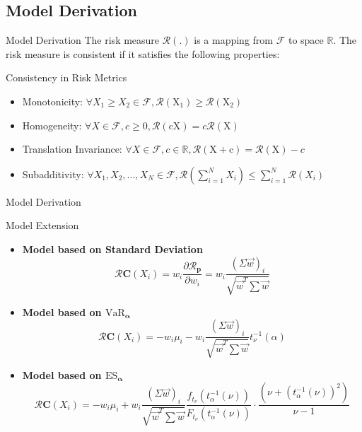 \documentclass{beamer}
\begin{document}
\subsection{Model Derivation}
\begin{frame}{Model Derivation}
The risk measure $\boldsymbol{\mathcal{R}}(.)$ is a mapping from $\mathcal{F}$ to space $\mathbb{R}$. The risk measure is consistent if it satisfies the following properties: 
\begin{block}{Consistency in Risk Metrics}
\begin{itemize}
  \item Monotonicity: $\forall X_1 \geq X_2 \in \mathcal{F}, \mathcal{R}\left(\mathrm{X}_1\right) \geq \mathcal{R}\left(\mathrm{X}_2\right)$ 
  \item Homogeneity: $\forall X \in \mathcal{F}, c \geq 0, \mathcal{R}(\mathrm{cX})=c \mathcal{R}(\mathrm{X})$
  \item Translation Invariance: $\forall X \in \mathcal{F}, c \in \mathbb{R}, \mathcal{R}(\mathrm{X}+\mathrm{c})=\mathcal{R}(\mathrm{X})-c$ 
  \item Subadditivity: $\forall X_1, X_2, \ldots, X_N \in \mathcal{F}, \mathcal{R}\left( \sum_{i=1}^{N} X_i\right) \leq \sum_{i=1}^{N} \mathcal{R}\left(X_i\right)$
\end{itemize}
\end{block}  
\end{frame}

\begin{frame}[t]{Model Derivation}
\begin{block}{Model Extension}
\begin{itemize}
    \item \textbf{Model based on Standard Deviation}
    \begin{equation*}
     \boldsymbol{\mathcal{R}}\boldsymbol{C}\left(X_i\right)=w_i \frac{\partial \boldsymbol{\mathcal{R}}_{\boldsymbol{p}}}{\partial w_i}=w_i \frac{(\Sigma \vec{w})_i}{\sqrt{\vec{w}^T \sum \vec{w}}}  
    \end{equation*}
    \item \textbf{Model based on $\text{VaR}_{\boldsymbol \alpha}$}
    \begin{equation*}
     \boldsymbol{\mathcal{R}}\boldsymbol{C}\left(X_i\right)=-w_i\mu_{i} - w_i \frac{(\Sigma \vec{w})_i}{\sqrt{\vec{w}^T \sum \vec{w}}}t_{\nu}^{-1}(\alpha)  
    \end{equation*}
    \item \textbf{Model based on $\text{ES}_{\boldsymbol \alpha}$}
    \begin{equation*}
     \boldsymbol{\mathcal{R}}\boldsymbol{C}\left(X_i\right)=-w_i\mu_{i} + w_i \frac{(\Sigma \vec{w})_i}{\sqrt{\vec{w}^T \sum \vec{w}}}\frac{f_{t_{\nu}}\left(t^{-1}_\alpha(\nu)\right)}{F_{t_{\nu}}\left(t^{-1}_\alpha(\nu)\right)} \cdot \frac{\left(\nu+(t^{-1}_\alpha(\nu))^2\right)}{\nu-1} 
    \end{equation*}
\end{itemize}
\end{block}  
\end{frame}
\end{document}
